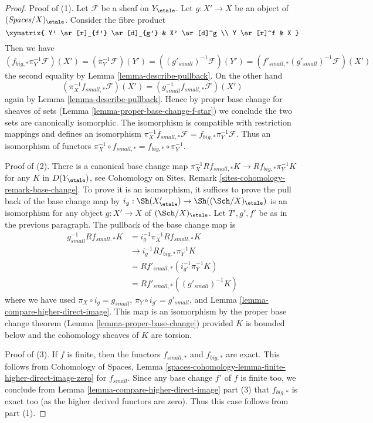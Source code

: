 \begin{proof}
Proof of (1). Let $\mathcal{F}$ be a sheaf on $Y_\etale$.
Let $g : X' \to X$ be an object of $(\textit{Spaces}/X)_\etale$.
Consider the fibre product
$$
\xymatrix{
Y' \ar[r]_{f'} \ar[d]_{g'} & X' \ar[d]^g \\
Y \ar[r]^f & X
}
$$
Then we have
$$
(f_{big, *}\pi_Y^{-1}\mathcal{F})(X') =
(\pi_Y^{-1}\mathcal{F})(Y') =
((g'_{small})^{-1}\mathcal{F})(Y')  =
(f'_{small, *}(g'_{small})^{-1}\mathcal{F})(X')
$$
the second equality by Lemma \ref{lemma-describe-pullback}.
On the other hand
$$
(\pi_X^{-1}f_{small, *}\mathcal{F})(X') =
(g_{small}^{-1}f_{small, *}\mathcal{F})(X')
$$
again by Lemma \ref{lemma-describe-pullback}.
Hence by proper base change for sheaves of sets
(Lemma \ref{lemma-proper-base-change-f-star})
we conclude the two sets are canonically isomorphic.
The isomorphism is compatible with restriction mappings
and defines an isomorphism
$\pi_X^{-1}f_{small, *}\mathcal{F} = f_{big, *}\pi_Y^{-1}\mathcal{F}$.
Thus an isomorphism of functors
$\pi_X^{-1} \circ f_{small, *} = f_{big, *} \circ \pi_Y^{-1}$.

\medskip\noindent
Proof of (2). There is a canonical base change map
$\pi_X^{-1}Rf_{small, *}K \to Rf_{big, *}\pi_Y^{-1}K$
for any $K$ in $D(Y_\etale)$, see
Cohomology on Sites, Remark \ref{sites-cohomology-remark-base-change}.
To prove it is an isomorphism, it suffices to prove the pull back of
the base change map by $i_g : \Sh(X'_\etale) \to \Sh((\Sch/X)_\etale)$
is an isomorphism for any object $g : X' \to X$ of $(\Sch/X)_\etale$.
Let $T', g', f'$ be as in the previous paragraph.
The pullback of the base change map is
\begin{align*}
g_{small}^{-1}Rf_{small, *}K
& =
i_g^{-1}\pi_X^{-1}Rf_{small, *}K \\
& \to
i_g^{-1}Rf_{big, *}\pi_Y^{-1}K \\
& =
Rf'_{small, *}(i_{g'}^{-1}\pi_Y^{-1}K) \\
& =
Rf'_{small, *}((g'_{small})^{-1}K)
\end{align*}
where we have used $\pi_X \circ i_g = g_{small}$,
$\pi_Y \circ i_{g'} = g'_{small}$, and
Lemma \ref{lemma-compare-higher-direct-image}.
This map is an isomorphism by the proper base change theorem
(Lemma \ref{lemma-proper-base-change}) provided $K$ is bounded
below and the cohomology sheaves of $K$ are torsion.

\medskip\noindent
Proof of (3). If $f$ is finite, then the functors
$f_{small, *}$ and $f_{big, *}$ are exact. This follows
from Cohomology of Spaces, Lemma
\ref{spaces-cohomology-lemma-finite-higher-direct-image-zero}
for $f_{small}$. Since any base change $f'$ of $f$ is finite too,
we conclude from Lemma \ref{lemma-compare-higher-direct-image} part (3)
that $f_{big, *}$ is exact too (as the higher derived functors are zero).
Thus this case follows from part (1).
\end{proof}







